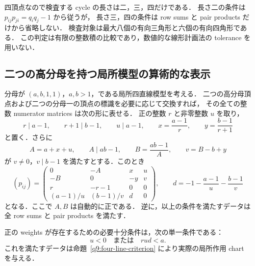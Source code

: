 四頂点なので検査する cycle の長さは二，三，四だけである．
長さ二の条件は $p_{ij}p_{ji}=q_iq_j-1$ から従うが，
長さ三，四の条件は row sums と pair products だけから省略しない．
検査対象は最大八個の有向三角形と六個の有向四角形である．
この判定は有限の整数積の比較であり，数値的な線形計画法の tolerance を用いない．

\subsection{二つの高分母を持つ局所模型の算術的な表示}
\label{kl10:two-high-section}

\begin{proposition}\label{kl10:two-high-parametrization}
分母が $(a,b,1,1)$，$a,b>1$，である局所四直線模型を考える．
二つの高分母頂点および二つの分母一の頂点の標識を必要に応じて交換すれば，
その全ての整数 numerator matrices は次の形に表せる．
正の整数 $r$ と非零整数 $u$ を取り，
\[
 r\mid a-1,\qquad r+1\mid b-1,\qquad u\mid a-1,
 \qquad x=\frac{a-1}{r},\qquad y=\frac{b-1}{r+1}
\]
と置く．さらに
\[
 A=a+x+u,\qquad A\mid ab-1,\qquad
 B=\frac{ab-1}{A},\qquad v=B-b+y
\]
が $v\ne0$，$v\mid b-1$ を満たすとする．このとき
\begin{equation}\label{kl10:two-high-matrix}
 (p_{ij})=
 \begin{pmatrix}
 0&-A&x&u\\
 -B&0&-y&v\\
 r&-r-1&0&0\\
 (a-1)/u&(b-1)/v&d&0
 \end{pmatrix},\qquad
 d=-1-\frac{a-1}{u}-\frac{b-1}{v}
\end{equation}
となる．ここで $A,B$ は自動的に正である．
逆に，以上の条件を満たすデータは全 row sums と pair products を満たす．

正の weights が存在するための必要十分条件は，次の単一条件である：
\begin{equation}\label{kl10:two-high-positive}
 u<0\quad\text{または}\quad rud<a.
\end{equation}
これを満たすデータは命題~\ref{q9:four-line-criterion} により実際の局所作用 chart を与える．
\end{proposition}

